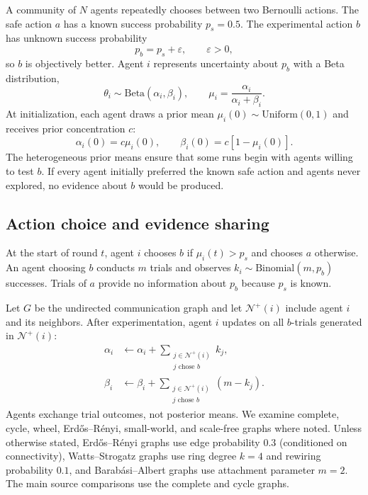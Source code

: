 \documentclass[10pt,letterpaper,twocolumn]{article}
\begin{document}
A community of $N$ agents repeatedly chooses between two Bernoulli actions. The safe action $a$ has a known success probability $p_s=0.5$. The experimental action $b$ has unknown success probability
\begin{equation}
  p_b = p_s + \varepsilon, \qquad \varepsilon>0,
\end{equation}
so $b$ is objectively better. Agent $i$ represents uncertainty about $p_b$ with a Beta distribution,
\begin{equation}
  \theta_i\sim\mathrm{Beta}(\alpha_i,\beta_i), \qquad
  \mu_i=\frac{\alpha_i}{\alpha_i+\beta_i}.
\end{equation}
At initialization, each agent draws a prior mean $\mu_i(0)\sim\mathrm{Uniform}(0,1)$ and receives prior concentration $c$:
\begin{equation}
  \alpha_i(0)=c\mu_i(0), \qquad
  \beta_i(0)=c[1-\mu_i(0)].
\end{equation}
The heterogeneous prior means ensure that some runs begin with agents willing to test $b$. If every agent initially preferred the known safe action and agents never explored, no evidence about $b$ would be produced.

\subsection{Action choice and evidence sharing}
\label{sec:sharing}

At the start of round $t$, agent $i$ chooses $b$ if $\mu_i(t)>p_s$ and chooses $a$ otherwise. An agent choosing $b$ conducts $m$ trials and observes $k_i\sim\mathrm{Binomial}(m,p_b)$ successes. Trials of $a$ provide no information about $p_b$ because $p_s$ is known.

Let $G$ be the undirected communication graph and let $\mathcal{N}^{+}(i)$ include agent $i$ and its neighbors. After experimentation, agent $i$ updates on all $b$-trials generated in $\mathcal{N}^{+}(i)$:
\begin{align}
  \alpha_i &\leftarrow \alpha_i+
  \sum_{\substack{j\in\mathcal{N}^{+}(i)\\j\text{ chose }b}} k_j,\\
  \beta_i &\leftarrow \beta_i+
  \sum_{\substack{j\in\mathcal{N}^{+}(i)\\j\text{ chose }b}}(m-k_j).
\end{align}
Agents exchange trial outcomes, not posterior means. We examine complete, cycle, wheel, Erd\H{o}s--R\'enyi, small-world, and scale-free graphs where noted. Unless otherwise stated, Erd\H{o}s--R\'enyi graphs use edge probability $0.3$ (conditioned on connectivity), Watts--Strogatz graphs use ring degree $k=4$ and rewiring probability $0.1$, and Barab\'asi--Albert graphs use attachment parameter $m=2$. The main source comparisons use the complete and cycle graphs.
\end{document}
